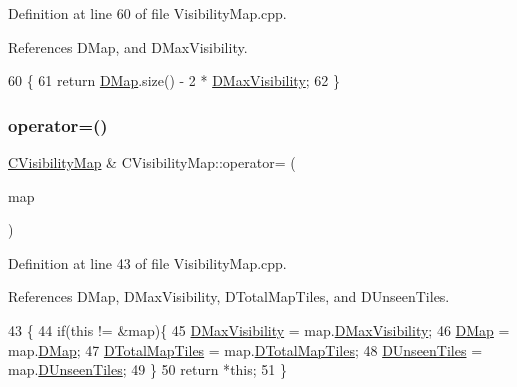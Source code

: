 Definition at line 60 of file Visibility\+Map.\+cpp.



References D\+Map, and D\+Max\+Visibility.


\begin{DoxyCode}
60                                 \{
61     \textcolor{keywordflow}{return} \hyperlink{classCVisibilityMap_ad217bc34f7a50dd357a3eeeb69cfdd85}{DMap}.size() - 2 * \hyperlink{classCVisibilityMap_ac8f71b9541c903fce0294d75daa1bbb1}{DMaxVisibility};
62 \}
\end{DoxyCode}
\hypertarget{classCVisibilityMap_a704cb26f12821ba012619ca1ae164ab5}{}\label{classCVisibilityMap_a704cb26f12821ba012619ca1ae164ab5} 
\subsubsection{\texorpdfstring{operator=()}{operator=()}}
{\footnotesize\ttfamily \hyperlink{classCVisibilityMap}{C\+Visibility\+Map} \& C\+Visibility\+Map\+::operator= (\begin{DoxyParamCaption}\item[{const \hyperlink{classCVisibilityMap}{C\+Visibility\+Map} \&}]{map }\end{DoxyParamCaption})}



Definition at line 43 of file Visibility\+Map.\+cpp.



References D\+Map, D\+Max\+Visibility, D\+Total\+Map\+Tiles, and D\+Unseen\+Tiles.


\begin{DoxyCode}
43                                                                   \{
44     \textcolor{keywordflow}{if}(\textcolor{keyword}{this} != &map)\{
45         \hyperlink{classCVisibilityMap_ac8f71b9541c903fce0294d75daa1bbb1}{DMaxVisibility} = map.\hyperlink{classCVisibilityMap_ac8f71b9541c903fce0294d75daa1bbb1}{DMaxVisibility};
46         \hyperlink{classCVisibilityMap_ad217bc34f7a50dd357a3eeeb69cfdd85}{DMap} = map.\hyperlink{classCVisibilityMap_ad217bc34f7a50dd357a3eeeb69cfdd85}{DMap};   
47         \hyperlink{classCVisibilityMap_a9bd6e633268535677aeefbd886c29485}{DTotalMapTiles} = map.\hyperlink{classCVisibilityMap_a9bd6e633268535677aeefbd886c29485}{DTotalMapTiles};
48         \hyperlink{classCVisibilityMap_a117ff39fef73ffd4cc4ba35c35e63171}{DUnseenTiles} = map.\hyperlink{classCVisibilityMap_a117ff39fef73ffd4cc4ba35c35e63171}{DUnseenTiles};
49     \}
50     \textcolor{keywordflow}{return} *\textcolor{keyword}{this};
51 \}
\end{DoxyCode}
\hypertarget{classCVisibilityMap_a1474250aca17378ff10f12b652bdc34a}{}\label{classCVisibilityMap_a1474250aca17378ff10f12b652bdc34a} 

